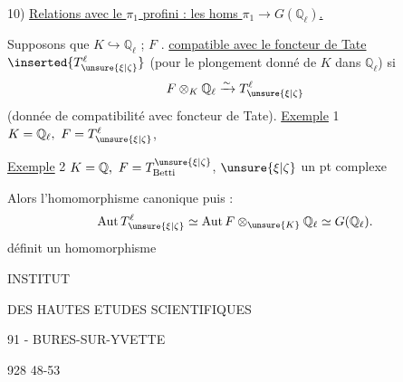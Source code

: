 10) \uline{Relations avec le $\pi_1$ profini : les homs $\pi_1\longrightarrow G(\mathbb{Q}_\ell)$.}

Supposons  que $K\hookrightarrow\mathbb{Q}_\ell$ ;
 $F$
.
\uline{compatible avec
le foncteur de Tate} $\inserted{T^\ell_{\unsure{\xi|\zeta}}}$
(pour le plongement donné
de $K$ dans $\mathbb{Q}_\ell$) si
\[
 F\otimes_K\mathbb{Q}_\ell \xrightarrow{\sim}T^\ell_{\unsure{\xi|\zeta}}
\]
(donnée de compatibilité avec foncteur de
Tate). \uline{Exemple} 1 \quad $K=\mathbb{Q}_\ell,\ F=T^\ell_{\unsure{\xi|\zeta}}$,

\uline{Exemple} 2 \quad $K=\mathbb{Q},\ F=T^{\unsure{\xi|\zeta}}_{\mathrm{Betti}}$,
$\unsure{\xi|\zeta}$ un pt complexe

Alors  l'homomorphisme canonique
puis :
\[
\operatorname{Aut}T^\ell_{\unsure{\xi|\zeta}}
 \simeq \operatorname{Aut}F\otimes_{\unsure{K}}\mathbb{Q}_\ell
 \simeq G(\mathbb{Q}_\ell).
\]
définit un homomorphisme

INSTITUT

DES HAUTES ETUDES SCIENTIFIQUES

91 - BURES-SUR-YVETTE

928 48-53


